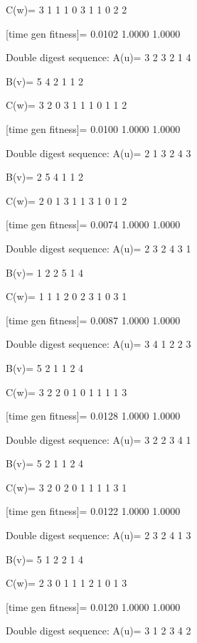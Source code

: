 C(w)=
     3     1     1     1     0     3     1     1     0     2     2

[time gen fitness]=
    0.0102    1.0000    1.0000

Double digest sequence:
A(u)=
     3     2     3     2     1     4

B(v)=
     5     4     2     1     1     2

C(w)=
     3     2     0     3     1     1     1     0     1     1     2

[time gen fitness]=
    0.0100    1.0000    1.0000

Double digest sequence:
A(u)=
     2     1     3     2     4     3

B(v)=
     2     5     4     1     1     2

C(w)=
     2     0     1     3     1     1     3     1     0     1     2

[time gen fitness]=
    0.0074    1.0000    1.0000

Double digest sequence:
A(u)=
     2     3     2     4     3     1

B(v)=
     1     2     2     5     1     4

C(w)=
     1     1     1     2     0     2     3     1     0     3     1

[time gen fitness]=
    0.0087    1.0000    1.0000

Double digest sequence:
A(u)=
     3     4     1     2     2     3

B(v)=
     5     2     1     1     2     4

C(w)=
     3     2     2     0     1     0     1     1     1     1     3

[time gen fitness]=
    0.0128    1.0000    1.0000

Double digest sequence:
A(u)=
     3     2     2     3     4     1

B(v)=
     5     2     1     1     2     4

C(w)=
     3     2     0     2     0     1     1     1     1     3     1

[time gen fitness]=
    0.0122    1.0000    1.0000

Double digest sequence:
A(u)=
     2     3     2     4     1     3

B(v)=
     5     1     2     2     1     4

C(w)=
     2     3     0     1     1     1     2     1     0     1     3

[time gen fitness]=
    0.0120    1.0000    1.0000

Double digest sequence:
A(u)=
     3     1     2     3     4     2

